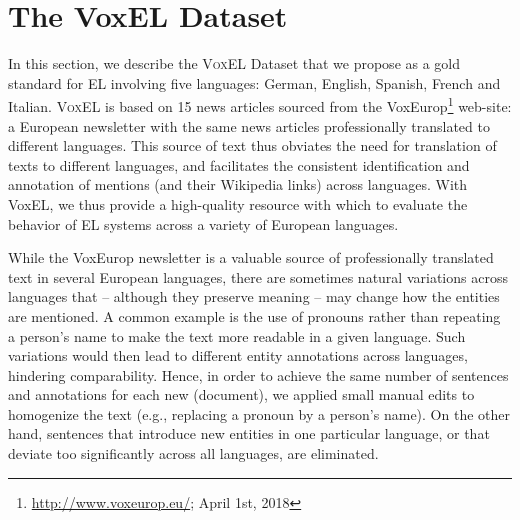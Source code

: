 \documentclass{llncs}
\begin{document}




\section{The VoxEL Dataset} \label{sec:voxel}

In this section, we describe the \textsc{VoxEL} Dataset that we propose as a gold standard for EL involving five languages: German, English, Spanish, French and Italian. \textsc{VoxEL} is based on 15 news articles sourced from the VoxEurop\footnote{\url{http://www.voxeurop.eu/}; April 1st, 2018} web-site: a European newsletter with the same news articles professionally translated to different languages. This source of text thus obviates the need for translation of texts to different languages, and facilitates the consistent identification and annotation of mentions (and their Wikipedia links) across languages. With VoxEL, we thus provide a high-quality resource with which to evaluate the behavior of EL systems across a variety of European languages. 

While the VoxEurop newsletter is a valuable source of professionally translated text in several European languages, there are sometimes natural variations across languages that -- although they preserve meaning -- may change how the entities are mentioned. A common example is the use of pronouns rather than repeating a person's name to make the text more readable in a given language. Such variations would then lead to different entity annotations across languages, hindering comparability. Hence, in order to achieve the same number of sentences and annotations for each new (document), we applied small manual edits to homogenize the text (e.g., replacing a pronoun by a person's name). On the other hand, sentences that introduce new entities in one particular language, or that deviate too significantly across all languages, are eliminated.
\end{document}
